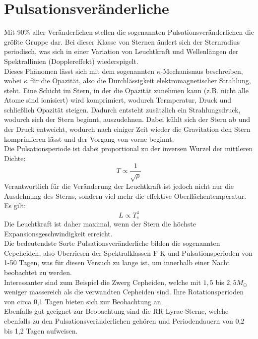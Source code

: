 \documentclass[ngerman,ruledheaders=section,class=report,thesis={type=Protokoll},accentcolor=1b,marginpar=false,parskip=half-,fontsize=11pt,]{tudapub}
\begin{document}
	\section{Pulsationsveränderliche}
	Mit 90\% aller Veränderlichen stellen die sogenannten Pulsationsveränderlichen die größte Gruppe dar. Bei dieser Klasse von Sternen ändert sich der Sternradius periodisch, was sich in einer Variation von Leuchtkraft und Wellenlängen der Spektrallinien (Dopplereffekt) wiederspigelt. \\
	Dieses Phänomen lässt sich mit dem sogenannten $\kappa$-Mechanismus beschreiben, wobei $\kappa$ für die Opazität, also die Durchlässigkeit elektromagnetischer Strahlung, steht. 
	Eine Schicht im Stern, in der die Opazität zunehmen kann (z.B. nicht alle Atome sind ionisiert) wird komprimiert, wodurch Termperatur, Druck und schließlich Opazität steigen. Dadurch entsteht zusätzlich ein Strahlungsdruck, wodurch sich der Stern beginnt, auszudehnen. Dabei kühlt sich der Stern ab und der Druck entweicht, wodurch nach einiger Zeit wieder die Gravitation den Stern komprimieren lässt und der Vorgang von vorne beginnt.
	\\
	Die Pulsationsperiode ist dabei proportional zu der inversen Wurzel der mittleren Dichte: 
	\begin{equation}
		T \propto \frac{1}{\sqrt{\rho}}
	\end{equation}
	Verantwortlich für die Veränderung der Leuchtkraft ist jedoch nicht nur die Ausdehnung des Sterns, sondern viel mehr die effektive Oberflächentemperatur. Es gilt:
	\begin{equation}
		L \propto T_s^4
	\end{equation}
	Die Leuchtkraft ist daher maximal, wenn der Stern die höchste Expansionsgeschwindigkeit erreicht.\\
	Die bedeutendste Sorte Pulsationsveränderliche bilden die sogenannten Cepeheiden, also Überriesen der Spektralklassen F-K und Pulsationsperioden von 1-50 Tagen, was für diesen Versuch zu lange ist, um innerhalb einer Nacht beobachtet zu werden. \\
	Interessanter sind zum Beispiel die Zwerg Cepheiden, welche mit $1,5$ bis $2,5M_\odot$ weniger massereich als die verwandten Cepheiden sind. Ihre Rotationsperioden von circa 0,1 Tagen bieten sich zur Beobachtung an. \\
	Ebenfalls gut geeignet zur Beobachtung sind die RR-Lyrae-Sterne, welche ebenfalls zu den Pulsationsveränderlichen gehören und Periodendauern von 0,2 bis 1,2 Tagen aufweisen. 
	
\end{document}
